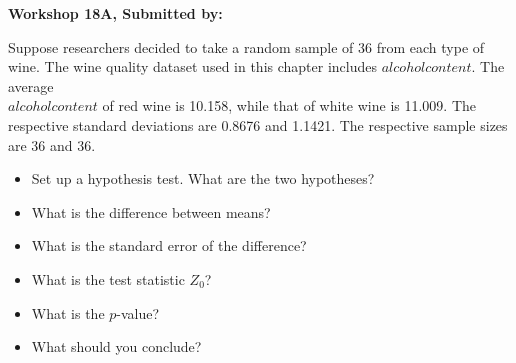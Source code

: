 \documentclass[11pt]{book}\usepackage[]{graphicx}\usepackage[]{color}
\begin{document}
\begin{exercises}
\begin{exercise}
\end{exercise}
\begin{solution}  %

\end{solution}

\clearpage

    \begin{exercise}  %



    \begin{center}
\begin{flushleft}\textbf{\large \hfill Workshop 18A, Submitted by: }\end{flushleft}

\end{center}

Suppose researchers decided to take a random sample of 36 from each type of wine.  The wine quality dataset used in this chapter includes $alcohol content$. The average \\ $alcohol content$ of red wine is 10.158, while that of white wine is 11.009. The respective standard deviations are 0.8676 and 1.1421. The respective sample sizes are 36 and 36.

\begin{itemize}
  \item Set up a hypothesis test. What are the two hypotheses?
  \item What is the difference between means?
  \item What is the standard error of the difference?
  \item What is the test statistic $Z_0$?
  \item What is the $p$-value?
  \item What should you conclude?
\end{itemize}


\end{exercise}
\end{exercises}
\end{document}
